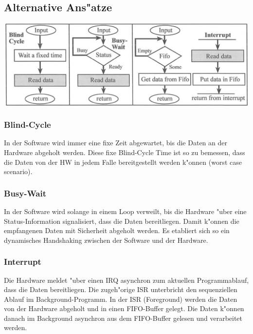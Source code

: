 \subsection{Alternative Ans"atze}
\begin{center}
	\includegraphics[width=16cm]{images/alternative-lesezugriffe}
\end{center}

\subsubsection{Blind-Cycle}
In der Software wird immer eine fixe Zeit abgewartet, bis die Daten an der
	Hardware abgeholt werden. Diese fixe Blind-Cycle Time ist so zu bemessen, dass die Daten von der HW in jedem Falle bereitgestellt werden k"onnen (worst case scenario).

\subsubsection{Busy-Wait}
In der Software wird solange in einem Loop verweilt, bis die Hardware "uber
eine Status-Information signalisiert, dass die Daten bereitliegen. Damit k"onnen die empfangenen Daten mit Sicherheit abgeholt werden. Es etabliert sich so ein dynamisches Handshaking zwischen der Software und der Hardware.


\subsubsection{Interrupt}
Die Hardware meldet "uber einen IRQ asynchron zum aktuellen
Programmablauf, dass die Daten bereitliegen. Die zugeh"orige ISR unterbricht den
sequenziellen Ablauf im Background-Programm. In der ISR (Foreground) werden die
Daten von der Hardware abgeholt und in einen FIFO-Buffer gelegt. Die Daten k"onnen danach im Background asynchron aus dem FIFO-Buffer gelesen und verarbeitet werden.